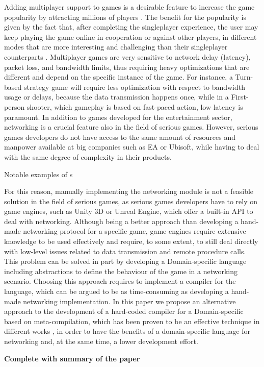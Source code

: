 Adding multiplayer support to games is a desirable feature to increase the game popularity by attracting millions of players \cite{ducheneaut2006alone}. The benefit for the popularity is given by the fact that, after completing the singleplayer experience, the user may keep playing the game online in cooperation or against other players, in different modes that are more interesting and challenging than their singleplayer counterparts \cite{pantel2002impact}. Multiplayer games are very sensitive to network delay (latency), packet loss, and bandwidth limits, thus requiring heavy optimizations that are different and depend on the specific instance of the game. For instance, a Turn-based strategy game will require less optimization with respect to bandwidth usage or delays, because the data transmission happens once, while in a First-person shooter, which gameplay is based on fast-paced action, low latency is paramount. In addition to games developed for the entertainment sector, networking is a crucial feature also in the field of serious games. However, serious games developers do not have access to the same amount of resources and manpower available at big companies such as EA or Ubisoft, while having to deal with the same degree of complexity in their products.

Notable examples of s

For this reason, manually implementing the networking module is not a feasible solution in the field of serious games, as serious games developers have to rely on game engines, such as Unity 3D or Unreal Engine, which offer a built-in API to deal with networking. Although being a better approach than developing a hand-made networking protocol for a specific game, game engines require extensive knowledge to be used effectively and require, to some extent, to still deal directly with low-level issues related to data transmission and remote procedure calls. This problem can be solved in part by developing a Domain-specific language including abstractions to define the behaviour of the game in a networking scenario. Choosing this approach requires to implement a compiler for the language, which can be argued to be as time-consuming as developing a hand-made networking implementation. In this paper we propose an alternative approach to the development of a hard-coded compiler for a Domain-specific based on meta-compilation, which has been proven to be an effective technique in different works \cite{kaagedal1998generating,DiGiacomo2017}, in order to have the benefits of a domain-specific language for networking and, at the same time, a lower development effort.
 
 \textbf{Complete with summary of the paper}